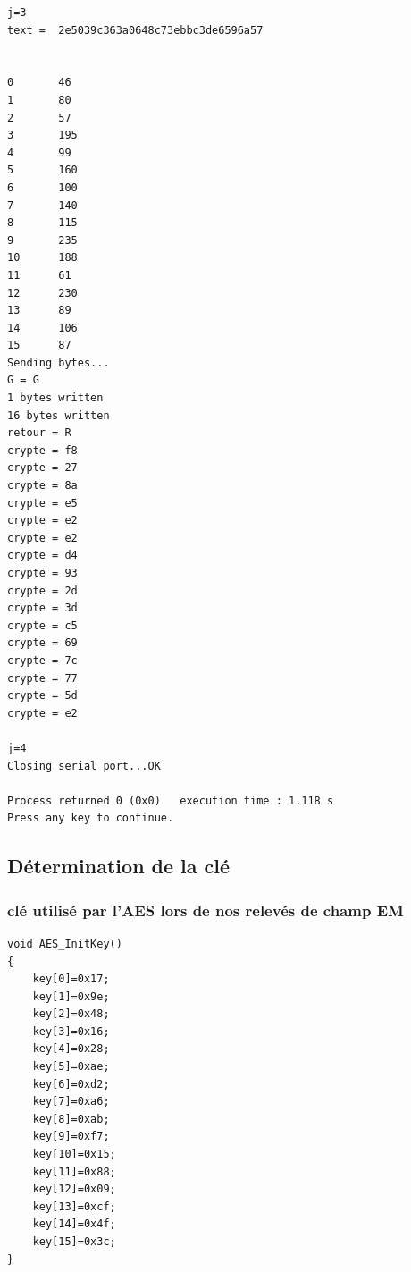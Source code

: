 \documentclass[a4paper, 12pt]{article}
\begin{document}
\begin{lstlisting}
j=3
text =  2e5039c363a0648c73ebbc3de6596a57


0       46
1       80
2       57
3       195
4       99
5       160
6       100
7       140
8       115
9       235
10      188
11      61
12      230
13      89
14      106
15      87
Sending bytes...
G = G
1 bytes written
16 bytes written
retour = R
crypte = f8
crypte = 27
crypte = 8a
crypte = e5
crypte = e2
crypte = e2
crypte = d4
crypte = 93
crypte = 2d
crypte = 3d
crypte = c5
crypte = 69
crypte = 7c
crypte = 77
crypte = 5d
crypte = e2

j=4
Closing serial port...OK

Process returned 0 (0x0)   execution time : 1.118 s
Press any key to continue.		
\end{lstlisting}

\newpage
	\subsection{Détermination de la clé}
		\subsubsection{clé utilisé par l'AES lors de nos relevés de champ EM}
\begin{lstlisting}
void AES_InitKey()
{
	key[0]=0x17;
	key[1]=0x9e;
	key[2]=0x48;
	key[3]=0x16;
	key[4]=0x28;
	key[5]=0xae;
	key[6]=0xd2;
	key[7]=0xa6;
	key[8]=0xab;
	key[9]=0xf7;
	key[10]=0x15;
	key[11]=0x88;
	key[12]=0x09;
	key[13]=0xcf;
	key[14]=0x4f;
	key[15]=0x3c;
}
\end{lstlisting}

\newpage
\end{document}
